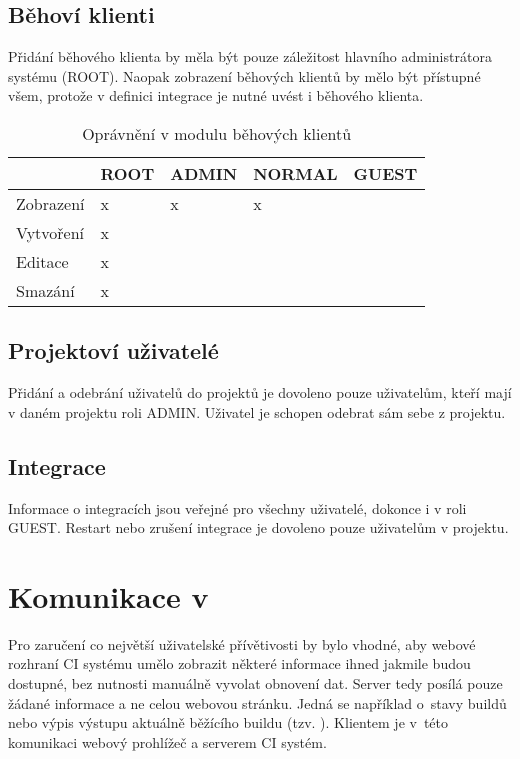 \subsection{Běhoví klienti}

Přidání běhového klienta by měla být pouze záležitost hlavního administrátora systému (ROOT).
Naopak zobrazení běhových klientů by mělo být přístupné všem, protože v definici integrace je nutné uvést i běhového klienta.

\begin{table}[h]
\centering
\caption{Oprávnění v modulu běhových klientů}
\begin{tabular}{|l|l|l|l|l|}
\hline
       & ROOT & ADMIN & NORMAL & GUEST \\ \hline
Zobrazení   & x    & x     & x      &       \\ \hline
Vytvoření & x    &       &        &       \\ \hline
Editace   & x    &       &        &       \\ \hline
Smazání & x    &       &        &      \\ \hline
\end{tabular}
\end{table}

\subsection{Projektoví uživatelé}

Přidání a odebrání uživatelů do projektů je dovoleno pouze uživatelům, kteří mají v daném projektu roli ADMIN.
Uživatel je schopen odebrat sám sebe z projektu.

\subsection{Integrace}

Informace o integracích jsou veřejné pro všechny uživatelé, dokonce i v roli GUEST.
Restart nebo zrušení integrace je dovoleno pouze uživatelům v projektu.

\section{Komunikace v }

Pro zaručení co největší uživatelské přívětivosti by bylo vhodné, aby webové rozhraní CI systému umělo zobrazit některé informace ihned jakmile budou dostupné, bez nutnosti manuálně vyvolat obnovení dat.
Server tedy posílá pouze žádané informace a ne celou webovou stránku.
Jedná se například o~stavy buildů nebo výpis výstupu aktuálně běžícího buildu (tzv. ).
Klientem je v~této komunikaci webový prohlížeč a serverem CI systém.

